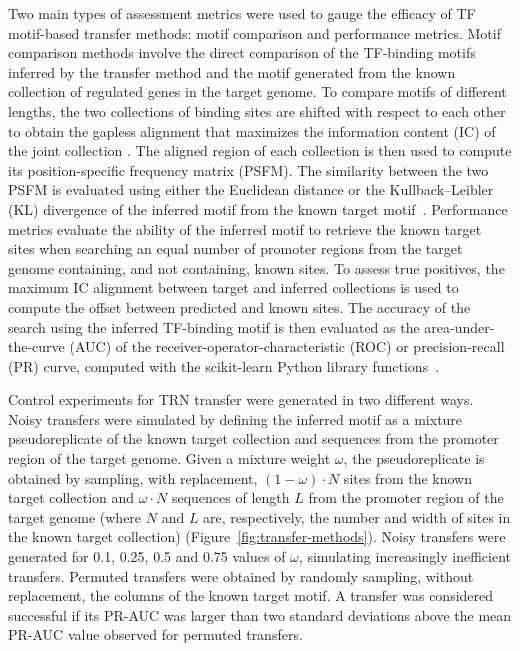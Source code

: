Two main types of assessment metrics were used to gauge the efficacy of TF
motif-based transfer methods: motif comparison and performance metrics. Motif
comparison methods involve the direct comparison of the TF-binding motifs
inferred by the transfer method and the motif generated from the known
collection of regulated genes in the target genome. To compare motifs of
different lengths, the two collections of binding sites are shifted with
respect to each other to obtain the gapless alignment that maximizes the
information content (IC) of the joint collection
\cite{schneider1986information}. The aligned region of each collection is then
used to compute its position-specific frequency matrix (PSFM). The similarity
between the two PSFM is evaluated using either the Euclidean distance or the
Kullback–Leibler (KL) divergence of the inferred motif from the known target
motif~\cite{gupta2007quantifying}. Performance metrics evaluate the ability of
the inferred motif to retrieve the known target sites when searching an equal
number of promoter regions from the target genome containing, and not
containing, known sites. To assess true positives, the maximum IC alignment
between target and inferred collections is used to compute the offset between
predicted and known sites. The accuracy of the search using the inferred
TF-binding motif is then evaluated as the area-under-the-curve (AUC) of the
receiver-operator-characteristic (ROC) or precision-recall (PR) curve, computed
with the scikit-learn Python library functions~\cite{lewis1991evaluating,
  zweig1993receiver, scikit-learn}.

Control experiments for TRN transfer were generated in two different
ways. Noisy transfers were simulated by defining the inferred motif as a
mixture pseudoreplicate of the known target collection and sequences from the
promoter region of the target genome. Given a mixture weight $\omega$, the
pseudoreplicate is obtained by sampling, with replacement, $(1-\omega) \cdot N$
sites from the known target collection and $\omega \cdot N$ sequences of length
$L$ from the promoter region of the target genome (where $N$ and $L$ are,
respectively, the number and width of sites in the known target collection)
(Figure~\ref{fig:transfer-methods}). Noisy transfers were generated for 0.1,
0.25, 0.5 and 0.75 values of $\omega$, simulating increasingly inefficient
transfers. Permuted transfers were obtained by randomly sampling, without
replacement, the columns of the known target motif. A transfer was considered
successful if its PR-AUC was larger than two standard deviations above the mean
PR-AUC value observed for permuted transfers.
